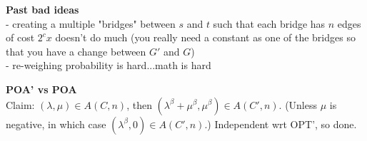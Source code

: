 \documentclass[11pt]{article}
\begin{document}
\textbf{Past bad ideas} \\
- creating a multiple "bridges" between $s$ and $t$ such that each bridge has
$n$ edges of cost $2^cx$ doesn't do much (you really need a constant as one of
the bridges so that you have a change between $G'$ and $G$) \\
- re-weighing probability is hard...math is hard

\textbf{POA' vs POA} \\
Claim: $(\lambda,\mu) \in A(C,n)$, then $(\lambda^\beta + \mu^\beta, \mu^\beta)
\in A(C',n)$. (Unless $\mu$ is negative, in which case $(\lambda^\beta, 0) \in
A(C',n)$.) Independent wrt OPT', so done. \cite{Roughgarden2012}

\nocite{Awerbuch2005}
\nocite{Christodoulou2005}
\nocite{Rieger2008}

\printbibliography
\end{document}
